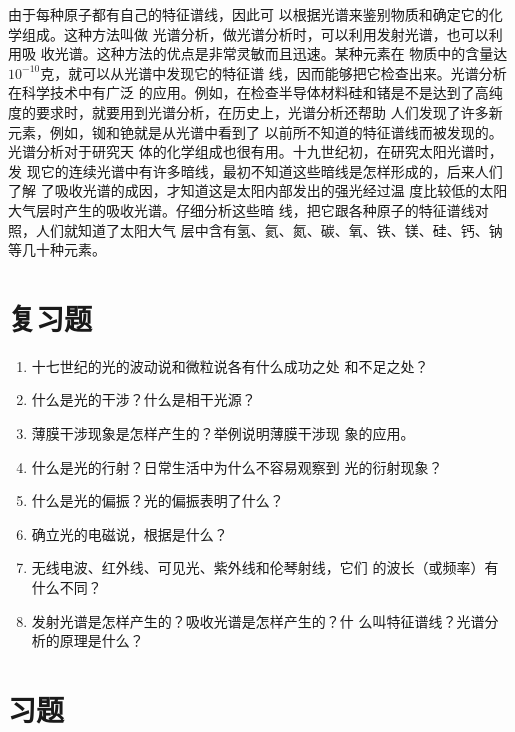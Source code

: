 由于每种原子都有自己的特征谱线，因此可
以根据光谱来鉴别物质和确定它的化学组成。这种方法叫做
光谱分析，做光谱分析时，可以利用发射光谱，也可以利用吸
收光谱。这种方法的优点是非常灵敏而且迅速。某种元素在
物质中的含量达$10^{-10}$克，就可以从光谱中发现它的特征谱
线，因而能够把它检查出来。光谱分析在科学技术中有广泛
的应用。例如，在检查半导体材料硅和锗是不是达到了高纯
度的要求时，就要用到光谱分析，在历史上，光谱分析还帮助
人们发现了许多新元素，例如，铷和铯就是从光谱中看到了
以前所不知道的特征谱线而被发现的。光谱分析对于研究天
体的化学组成也很有用。十九世纪初，在研究太阳光谱时，发
现它的连续光谱中有许多暗线，最初不知道这些暗线是怎样形成的，后来人们了解
了吸收光谱的成因，才知道这是太阳内部发出的强光经过温
度比较低的太阳大气层时产生的吸收光谱。仔细分析这些暗
线，把它跟各种原子的特征谱线对照，人们就知道了太阳大气
层中含有氢、氦、氮、碳、氧、铁、镁、硅、钙、钠等几十种元素。

\section*{复习题}
\begin{enumerate}
\item 十七世纪的光的波动说和微粒说各有什么成功之处
和不足之处？
\item 什么是光的干涉？什么是相干光源？
\item 薄膜干涉现象是怎样产生的？举例说明薄膜干涉现
象的应用。
\item 什么是光的行射？日常生活中为什么不容易观察到
光的衍射现象？
\item 什么是光的偏振？光的偏振表明了什么？
\item 确立光的电磁说，根据是什么？
\item 无线电波、红外线、可见光、紫外线和伦琴射线，它们
的波长（或频率）有什么不同？
\item 发射光谱是怎样产生的？吸收光谱是怎样产生的？什
么叫特征谱线？光谱分析的原理是什么？
\end{enumerate}

\section*{习题}

